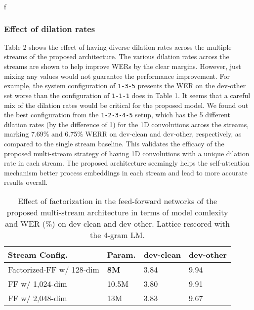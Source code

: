 f\documentclass{article}
\begin{document}
\subsubsection{Effect of dilation rates}
Table 2 shows the effect of having diverse dilation rates across the multiple streams of the proposed architecture. The various dilation rates across the streams are shown to help improve WERs by the clear margins. However, just mixing any values would not guarantee the performance improvement. For example, the system configuration of \texttt{1-3-5} presents the WER on the dev-other set worse than the configuration of \texttt{1-1-1} does in Table 1. It seems that a careful mix of the dilation rates would be critical for the proposed model. We found out the best configuration from the \texttt{1-2-3-4-5} setup, which has the 5 different dilation rates (by the difference of 1) for the 1D convolutions across the streams, marking 7.69\% and 6.75\% WERR on dev-clean and dev-other, respectively, as compared to the single stream baseline. This validates the efficacy of the proposed multi-stream strategy of having 1D convolutions with a unique dilation rate in each stream. The proposed architecture seemingly helps the self-attention mechanism better process embeddings in each stream and lead to more accurate results overall.

\begin{table}[t]
\centering
    \caption{Effect of factorization in the feed-forward networks of the proposed multi-stream architecture in terms of model comlexity and WER (\%) on dev-clean and dev-other. Lattice-rescored with the 4-gram LM.}
    \renewcommand{\arraystretch}{1.25}
    \begin{tabular}{C{3.4cm}|C{1cm}|C{1.25cm}|C{1.25cm}}
        \hline
        \small Stream Config. & \small Param. & \small dev-clean & \small dev-other\\
        \hline

        \centering \small Factorized-FF w/ 128-dim & \small \textbf{8M}  & \small 3.84 & \small 9.94  \\
        \hline
        \centering \small FF w/ 1,024-dim & \small 10.5M & \small 3.80 & \small 9.91 \\
        \hline
        \centering \small FF w/ 2,048-dim & \small 13M & \small 3.83 & \small 9.67 \\
        \hline
    \end{tabular}
    \label{tab:adaptation}
\end{table}
\end{document}
